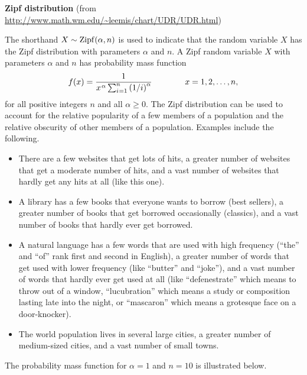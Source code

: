 \documentclass[12pt,fullpage]{article}
\begin{document}
\noindent
{\bf Zipf distribution} (from \color{blue}\url{http://www.math.wm.edu/~leemis/chart/UDR/UDR.html}\color{black})

\noindent
The shorthand $X \sim {\rm Zipf}(\alpha, n)$ is used to indicate that the
random variable $X$ has the Zipf distribution with parameters $\alpha$ and $n$.
A Zipf random variable $X$ with parameters $\alpha$ and $n$ has probability mass function 
$$
f(x) = {\frac {1}{{x} ^ {\kern 0.08 em\alpha}\sum _{i \kern 0.04 em =1}^{n} \left(1/i
 \right) ^ {\alpha}}} \qquad \qquad x = 1, 2, \ldots, n,
$$
for all positive integers $n$ and all $\alpha \geq 0$.
The Zipf distribution can be used to account for the relative popularity of
a few members of a population and the relative obscurity of other members 
of a population.  Examples include the following.
\begin{itemize}
\item There are a few websites that get lots of hits, a greater number of websites that get a 
moderate number of hits, and a vast number of websites that hardly get any hits at all (like this one).
\item A library has a few books that everyone wants to borrow (best sellers),
a greater number of books that get borrowed occasionally (classics), and a vast number of books that
hardly ever get borrowed.
\item A natural language has a few words that are used with high frequency
(``the'' and ``of'' rank first and second in English), a greater number of words that
get used with lower frequency (like ``butter'' and ``joke''), and a vast number of words that hardly
ever get used at all (like
``defenestrate'' which means to throw out of a window,
``lucubration'' which means a study or composition lasting late into the night,
or ``mascaron'' which means a grotesque face on a door-knocker).
\item  The world population lives in several large cities, a greater number of medium-sized cities,
and a vast number of small towns.
\end{itemize}
The probability mass function for $\alpha = 1$ and $n = 10$ is illustrated below.
\end{document}

